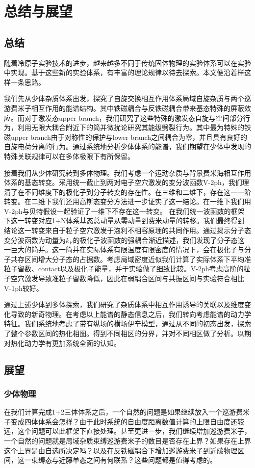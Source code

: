 \chapter{总结与展望}\label{chap:summaryandoutlook}

\section{总结}
随着冷原子实验技术的进步，越来越多不同于传统固体物理的实验体系可以在实验中实现。基于这些新的实验体系，有丰富的理论规律以待去探索。本文便沿着样这样一条思路。

我们先从少体杂质体系出发，探究了自旋交换相互作用体系局域自旋杂质与两个巡游费米子相互作用的能谱结构。其中铁磁耦合与反铁磁耦合带来基态特殊的屏蔽效应。而对于激发态upper branch，我们研究了这些特殊的激发态自旋与空间部分行为，利用无限大耦合附近下的简并微扰论研究其能级劈裂行为。其中最为特殊的铁磁upper branch由于对称性的保护与lower branch之间耦合为零，并且具有良好的自旋电荷分离的行为。通过系统地分析少体体系的能谱，我们期望在少体中发现的特殊关联规律可以在多体极限下有所保留。

接着我们从少体研究转到多体物理。我们考虑一个运动杂质与背景费米海相互作用体系的基态转变。采用统一截止到两对电子空穴激发的变分波函数V-2ph，我们理清了在不同维度下的极化子到分子转变的存在性。在三维和二维下，存在这一一阶转变。在二维下我们还用高斯态变分方法进一步证实了这一结论。在一维下我们用V-2ph与贝特假设一起验证了一维下不存在这一转变。 在我们统一波函数的框架下这一转变对应1+N体系基态总动量从零动量到费米动量的转移。我们最终得到结论这一转变来自于粒子空穴激发于泡利不相容原理的共同作用。通过揭示分子态变分波函数为动量为$k_F$的极化子波函数的强耦合渐近描述，我们发现了分子态这一巨大的简并。这一简并在实际体系有限温度有限密度的情况下，会在极化子与分子共存区间增大分子态的占据数。考虑局域密度近似我们计算了实际体系下平均准粒子留数、contact以及极化子能量，并于实验做了细致比较。V-2ph考虑高阶的粒子空穴激发导致准粒子留数降低，因此在弱耦合区间与共振区间与实验符合相比V-1ph较好。

通过上述少体到多体探索，我们研究了杂质体系中相互作用诱导的关联以及维度变化导致的新奇物理。在考虑以上能谱的静态信息之后，我们转向考虑能谱的动力学特征。我们系统地考虑了带有纵场的横场伊辛模型，通过从不同的初态出发，探索了整个参数区间的热化相图。得到不同相区的分界，并对不同相区做了分析。以期对热化动力学有更加系统全面的认知。

\section{展望}
\subsection{少体物理}
在我们计算完成1+2三体体系之后，一个自然的问题是如果继续放入一个巡游费米子变成四体体系会怎样？由于此时系统的自由度距离数值计算的上限自由度还较远，这个问题可以此框架下直接处理。甚至更进一步，我们继续增加巡游费米子，一个自然的问题就是局域杂质束缚巡游费米子的数目是否存在上界？如果存在上界这个上界是由自选所决定吗？以及在反铁磁耦合下增加巡游费米子到近藤物理区间，这一束缚态与近藤单态之间有何联系？这些问题都是值得考虑的。

